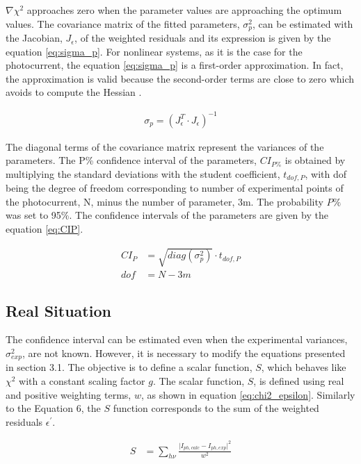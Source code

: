 \documentclass[10pt, 3p, sort&compress]{elsarticle}
\newcommand{\modi}[1]{\vert #1 \vert}
\newcommand{\sigmae}{\sigma _{exp}}
\newcommand{\sigmap}{\sigma _{p}}
\newcommand{\iphe}{I_{ph,exp}}
\newcommand{\iphc}{I_{ph,calc}}
\newcommand{\gradX}{\nabla \chi ^2}
\newcommand{\je}{J _{\epsilon}}
\newcommand{\hv}{h  \nu}
\newcommand{\tvp}{t_{dof,P}}
\newcommand{\epsp}{\epsilon ^{\prime}}
\begin{document}
$\gradX$ approaches zero when the parameter values are approaching the optimum values. The covariance matrix of the fitted parameters, $\sigmap ^2$, can be estimated with the Jacobian, $\je$, of the weighted residuals \citep{bevington2003} and its expression is given by the equation \ref{eq:sigma_p}. For nonlinear systems, as it is the case for the photocurrent, the equation \ref{eq:sigma_p} is a first-order approximation. In fact, the approximation is valid because the second-order terms are close to zero which avoids to compute the Hessian \citep{press2007}.

\begin{equation}
\begin{split}
\sigmap = ( \je ^T \cdot \je ) ^{-1}
\end{split}
\label{eq:sigma_p}
\end{equation}

The diagonal terms of the covariance matrix represent the variances of the parameters. The P\% confidence interval of the parameters, $CI_{P\%}$ is obtained by multiplying the standard deviations with the student coefficient, $\tvp$, with dof being the degree of freedom corresponding to number of experimental points of the photocurrent, N, minus the number of parameter, 3m. The probability $P\%$ was set to 95\%. The confidence intervals of the parameters are given by the equation \ref{eq:CIP}.

\begin{equation}
\begin{split}
CI_P &= \sqrt{ diag(\sigmap ^2)} \cdot \tvp \\
dof &= N-3m
\end{split}
\label{eq:CIP}
\end{equation}

\subsection{Real Situation}
The confidence interval can be estimated even when the experimental variances, $\sigmae ^2$, are not known. However, it is necessary to modify the equations presented in section 3.1. The objective is to define a scalar function, $S$, which behaves like $\chi ^2$ with a constant scaling factor $g$. The scalar function, $S$, is defined using real and positive weighting terms, $w$, as shown in equation \ref{eq:chi2_epsilon}. Similarly to the Equation 6, the $S$ function corresponds to the sum of the weighted residuals $\epsp$.

\begin{equation}
\begin{split}
S &= \sum _{\hv} \frac{\modi{\iphc-\iphe}^2}{w ^2} \\
\end{split}
\label{eq:S}
\end{equation}
\end{document}
